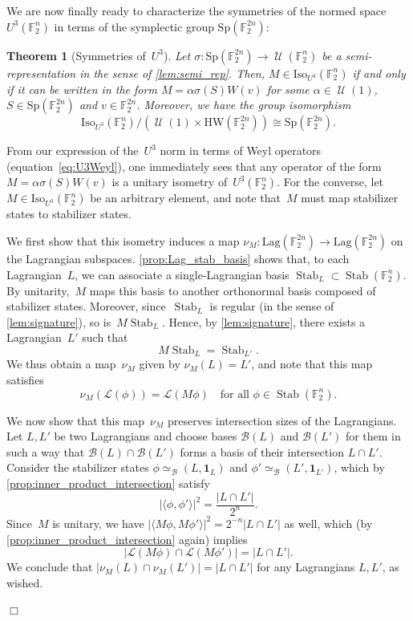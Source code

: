 \documentclass[11pt]{amsart}
\newcommand{\Lag}{\mathrm{Lag}}
\DeclareMathOperator{\Stab}{Stab}\DeclareMathOperator{\Spec}{Spec}
\newcommand{\F}{\mathbb{F}} %
\newcommand{\Lcal}{\mathcal{L}}
\newcommand{\HW}{\mathrm{HW}}
\newcommand{\Iso}{\mathrm{Iso}}
\newcommand{\Sp}{\mathrm{Sp}}
\newcommand{\one}{\mathbf{1}}
\DeclareMathOperator{\U}{\mathcal{U}}
\newcommand{\B}{\mathcal B}
\theoremstyle{plain}
\newtheorem{theorem}{Theorem}[section]
\theoremstyle{definition}
\theoremstyle{remark}
\renewenvironment{proof}[1][]{
    	\begin{trivlist}
     	\item[\hspace{\labelsep}{\em\noindent Proof#1:\/}]}
     	{{\hfill$\Box$}
    	\end{trivlist}
  }
\begin{document}
We are now finally ready to characterize the symmetries of the normed space $U^3(\F_2^n)$ in terms of the symplectic group $\Sp(\F_2^{2n})$:

\begin{theorem}[Symmetries of~$U^3$] \label{thm:isoU3}
    Let $\sigma: \Sp(\F_2^{2n}) \to \U(\F_2^n)$ be a semi-representation in the sense of \cref{lem:semi_rep}.
    Then, $M\in \Iso_{U^3}(\F_2^n)$ if and only if it can be written in the form $M = \alpha \sigma(S)W(v)$ for some $\alpha\in \U(1)$, $S\in \Sp(\F_2^{2n})$ and $v\in \F_2^{2n}$.
    Moreover, we have the group isomorphism
    $$\Iso_{U^3}(\F_2^n)/(\U(1)\times \HW(\F_2^{2n})) \cong \Sp(\F_2^{2n}).$$
\end{theorem}

\begin{proof}
From our expression of the~$U^3$ norm in terms of Weyl operators (equation~\eqref{eq:U3Weyl}), one immediately sees that any operator of the form $M = \alpha \sigma(S)W(v)$ is a unitary isometry of~$U^3(\F_2^n)$.
For the converse, let $M\in \Iso_{U^3}(\F_2^n)$ be an arbitrary element, and note that~$M$ must map stabilizer states to stabilizer states.

We first show that this isometry induces a map $\nu_M: \Lag(\F_2^{2n}) \to \Lag(\F_2^{2n})$ on the Lagrangian subspaces.
\cref{prop:Lag_stab_basis} shows that, to each Lagrangian~$L$, we can associate a single-Lagrangian basis $\Stab_L \subset \Stab(\F_2^n)$.
By unitarity,~$M$ maps this basis to another orthonormal basis composed of stabilizer states.
Moreover, since~$\Stab_L$ is regular (in the sense of \cref{lem:signature}), so is~$M\Stab_L$.
Hence, by \cref{lem:signature}, there exists a Lagrangian~$L'$ such that
\begin{equation*}
    M\Stab_L = \Stab_{L'}.
\end{equation*}
We thus obtain a map~$\nu_M$ given by $\nu_M(L) = L'$, and note that this map satisfies
$$\nu_M(\Lcal(\phi)) = \Lcal(M\phi) \quad \text{for all $\phi\in \Stab(\F_2^n)$.}$$

We now show that this map~$\nu_M$ preserves intersection sizes of the Lagrangians.
Let $L, L'$ be two Lagrangians and choose bases $\B(L)$ and $\B(L')$ for them in such a way that $\B(L) \cap \B(L')$ forms a basis of their intersection $L\cap L'$.
Consider the stabilizer states $\phi \simeq_\B (L, \one_L)$ and $\phi' \simeq_\B (L', \one_{L'})$, which by \cref{prop:inner_product_intersection} satisfy
$$|\langle\phi, \phi'\rangle|^2 = \frac{|L\cap L'|}{2^n}.$$
Since~$M$ is unitary, we have $|\langle M\phi, M\phi'\rangle|^2 = 2^{-n}|L\cap L'|$ as well, which (by \cref{prop:inner_product_intersection} again) implies
$$|\Lcal(M\phi) \cap \Lcal(M\phi')| = |L\cap L'|.$$
We conclude that $|\nu_M(L) \cap \nu_M(L')| = |L\cap L'|$ for any Lagrangians $L, L'$, as wished.


\end{proof}
\end{document}
